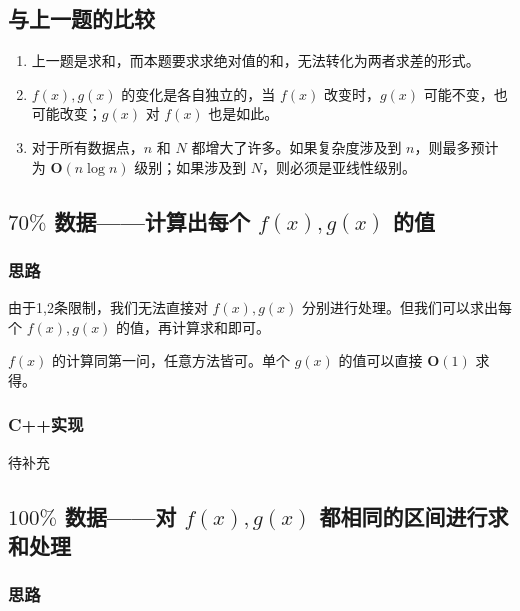 
% 

\subsection{与上一题的比较}

\begin{enumerate}
  \item 上一题是求和，而本题要求求绝对值的和，无法转化为两者求差的形式。
  \item $f(x),g(x)$ 的变化是各自独立的，当 $f(x)$ 改变时，$g(x)$ 可能不变，也可能改变；$g(x)$ 对 $f(x)$ 也是如此。
  \item 对于所有数据点，$n$ 和 $N$ 都增大了许多。如果复杂度涉及到 $n$，则最多预计为 $\mathbf{O}(n\log n)$ 级别；如果涉及到 $N$，则必须是亚线性级别。
\end{enumerate}

\subsection{\texorpdfstring{$70\%$}{70\%} 数据——计算出每个 \texorpdfstring{$f(x),g(x)$}{f(x),g(x)} 的值}

\subsubsection{思路}

由于1,2条限制，我们无法直接对 $f(x),g(x)$ 分别进行处理。但我们可以求出每个 $f(x),g(x)$ 的值，再计算求和即可。

$f(x)$ 的计算同第一问，任意方法皆可。单个 $g(x)$ 的值可以直接 $\mathbf{O}(1)$ 求得。

\subsubsection{C++实现}

待补充

\subsection{\texorpdfstring{$100\%$}{100\%} 数据——对 \texorpdfstring{$f(x),g(x)$}{f(x),g(x)} 都相同的区间进行求和处理}

\subsubsection{思路}

